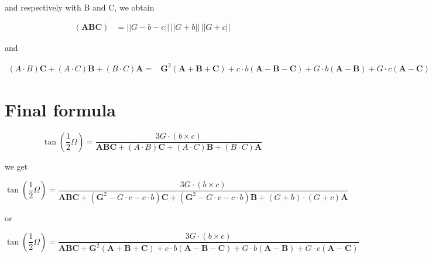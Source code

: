 \documentclass[10pt,a4paper]{article}
\begin{document}
and respectively with B and C, we obtain


\begin{align}
(\mathbf{A}\mathbf{B}\mathbf{C}) &= ||G-b-c||\,||G+b||\,||G+c||
\end{align}

and


\begin{align}
 \left({A}\cdot {B}\right)\mathbf{C}
  + \left({A}\cdot {C}\right)\mathbf{B}
   + \left({B}\cdot {C}\right)\mathbf{A}
	=& \mathbf{G}^2 (\mathbf{A} + \mathbf{B} + \mathbf{C})
	+ c \cdot b (\mathbf{A} - \mathbf{B} - \mathbf{C})
	 + G \cdot b (\mathbf{A} - \mathbf{B})
	  + G \cdot c (\mathbf{A} - \mathbf{C})
\end{align}


\section{Final formula}


$$
{\displaystyle \tan \left({\frac {1}{2}}\Omega \right)
  = {\frac {3 G \cdot \left( b \times c \right)}
    {\mathbf{A}\mathbf{B}\mathbf{C} + \left({A}\cdot {B}\right)\mathbf{C}
      + \left({A}\cdot {C}\right)\mathbf{B}
      + \left({B}\cdot {C}\right)\mathbf{A}}}}
$$

we get

$$
{\displaystyle \tan \left({\frac {1}{2}}\Omega \right)
  = {\frac {3 G \cdot \left( b \times c \right)}
    {\mathbf{A}\mathbf{B}\mathbf{C} +
    (\mathbf{G}^2 - G \cdot c - c \cdot b)\mathbf{C}
      + (\mathbf{G}^2 - G \cdot c - c \cdot b)\mathbf{B}
      + \left( G + b \right) \cdot \left( G + c \right) \mathbf{A}
      }}}
$$

or

$$
{\displaystyle \tan \left({\frac {1}{2}}\Omega \right)
  = {\frac {3 G \cdot \left( b \times c \right)}
    {\mathbf{A}\mathbf{B}\mathbf{C} +
    \mathbf{G}^2 (\mathbf{A} + \mathbf{B} + \mathbf{C})
	+ c \cdot b (\mathbf{A} - \mathbf{B} - \mathbf{C})
	 + G \cdot b (\mathbf{A} - \mathbf{B})
	  + G \cdot c (\mathbf{A} - \mathbf{C})
      }}}
$$
\end{document}
